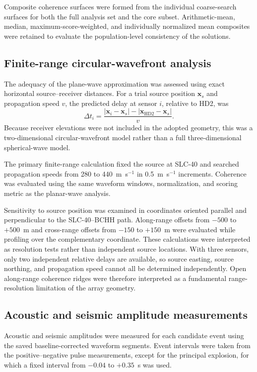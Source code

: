 \documentclass[]{seismica}
\begin{document}
Composite coherence surfaces were formed from the individual coarse-search surfaces for both the full analysis set and the core subset. Arithmetic-mean, median, maximum-score-weighted, and individually normalized mean composites were retained to evaluate the population-level consistency of the solutions.

\subsection{Finite-range circular-wavefront analysis}

The adequacy of the plane-wave approximation was assessed using exact horizontal source--receiver distances. For a trial source position $\mathbf{x}_s$ and propagation speed $v$, the predicted delay at sensor $i$, relative to HD2, was
\begin{equation}
  \Delta t_i = \frac{|\mathbf{x}_i-\mathbf{x}_s|-|\mathbf{x}_{\mathrm{HD2}}-\mathbf{x}_s|}{v}.
  \label{eq:circular_delay}
\end{equation}
Because receiver elevations were not included in the adopted geometry, this was a two-dimensional circular-wavefront model rather than a full three-dimensional spherical-wave model.

The primary finite-range calculation fixed the source at SLC-40 and searched propagation speeds from 280 to 440~m~s$^{-1}$ in 0.5~m~s$^{-1}$ increments. Coherence was evaluated using the same waveform windows, normalization, and scoring metric as the planar-wave analysis.

Sensitivity to source position was examined in coordinates oriented parallel and perpendicular to the SLC-40--BCHH path. Along-range offsets from $-500$ to $+500$~m and cross-range offsets from $-150$ to $+150$~m were evaluated while profiling over the complementary coordinate. These calculations were interpreted as resolution tests rather than independent source locations. With three sensors, only two independent relative delays are available, so source easting, source northing, and propagation speed cannot all be determined independently. Open along-range coherence ridges were therefore interpreted as a fundamental range-resolution limitation of the array geometry.

\subsection{Acoustic and seismic amplitude measurements}

Acoustic and seismic amplitudes were measured for each candidate event using the saved baseline-corrected waveform segments. Event intervals were taken from the positive--negative pulse measurements, except for the principal explosion, for which a fixed interval from $-0.04$ to $+0.35$~s was used.
\end{document}
